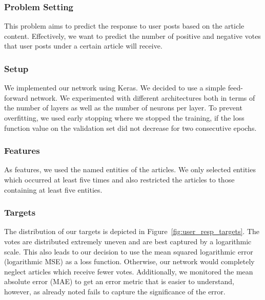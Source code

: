 \documentclass[acmsmall]{acmart}
\begin{document}
\subsubsection{Problem Setting}
This problem aims to predict the response to user posts based on the article content. Effectively, we want to predict the number of positive and negative votes that user posts under a certain article will receive. 

\subsubsection{Setup}
We implemented our network using Keras. We decided to use a simple feed-forward network. We experimented with different architectures both in terms of the number of layers as well as the number of neurons per layer. To prevent overfitting, we used early stopping where we stopped the training, if the loss function value on the validation set did not decrease for two consecutive epochs. 

\subsubsection{Features}
As features, we used the named entities of the articles. We only selected entities which occurred at least five times and also restricted the articles to those containing at least five entities. 

\subsubsection{Targets}
The distribution of our targets is depicted in Figure~\ref{fig:user_resp_targets}. The votes are distributed extremely uneven and are best captured by a logarithmic scale. This also leads to our decision to use the mean squared logarithmic error (logarithmic MSE) as a loss function. Otherwise, our network would completely neglect articles which receive fewer votes. Additionally, we monitored the mean absolute error (MAE) to get an error metric that is easier to understand, however, as already noted fails to capture the significance of the error.  
\end{document}
